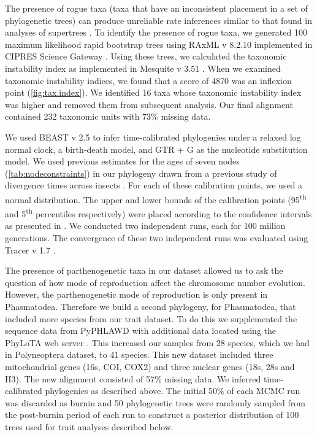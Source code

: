 The presence of rogue taxa (taxa that have an inconsistent placement in a set of phylogenetic trees) can produce unreliable rate inferences similar to that found in analyses of supertrees \citep{aberer2012roguetaxa, rabosky2015b}.
To identify the presence of rogue taxa, we generated 100 maximum likelihood rapid bootstrap trees using RAxML v 8.2.10 implemented in CIPRES Science Gateway \citep{stamatakis2014raxml,miller2010cipres}.
Using these trees, we calculated the taxonomic instability index as implemented in Mesquite v 3.51 \citep{maddison2018mesquite}.
When we examined taxonomic instability indices, we found that a score of 4870 was an inflexion point (\cref{fig:tax.index}).
We identified 16 taxa whose taxonomic instability index was higher and removed them from subsequent analysis.
Our final alignment contained 232 taxonomic units with 73\% missing data.

We used BEAST v 2.5 \citep{bouckaert2014beast} to infer time-calibrated phylogenies under a relaxed log normal clock, a birth-death model, and GTR + G as the nucleotide substitution model.
We used previous estimates for the ages of seven nodes (\cref{tab:nodeconstraints}) in our phylogeny drawn from a previous study of divergence times across insects \citep{misof2014phylogenomics}.
For each of these calibration points, we used a normal distribution.
The upper and lower bounds of the calibration points (95\textsuperscript{th} and 5\textsuperscript{th} percentiles respectively) were placed according to the confidence intervals as presented in \citet{misof2014phylogenomics}. 
We conducted two independent runs, each for 100 million generations.
The convergence of these two independent runs was evaluated using Tracer v 1.7 \citep{rambaut2018tracer}.

The presence of parthenogenetic taxa in our dataset allowed us to ask the question of how mode of reproduction affect the chromosome number evolution.
However, the parthenogenetic mode of reproduction is only present in Phasmatodea.
Therefore we build a second phylogeny, for Phasmatodea, that included more species from our trait dataset.
To do this we supplemented the sequence data from PyPHLAWD with additional data located using the PhyLoTA web server \citep{sanderson2008}.
This increased our samples from 28 species, which we had in Polyneoptera dataset, to 41 species. 
This new dataset included three mitochondrial genes (16s, COI, COX2) and three nuclear genes (18s, 28s and H3).
The new alignment consisted of 57\% missing data.
We inferred time-calibrated phylogenies as described above.
The initial 50\% of each MCMC run was discarded as burnin and 50 phylogenetic trees were randomly sampled from the post-burnin period of each run to construct a posterior distribution of 100 trees used for trait analyses described below.

